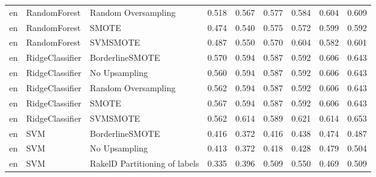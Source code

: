 \begin{tabular}{lllllllll}
      en &                    RandomForest &           Random Oversampling & 0.518 &                     0.567 &                 0.577 &                  0.584 &                                   0.604 &     0.609 \\
      en &                    RandomForest &                         SMOTE & 0.474 &                     0.540 &                 0.575 &                  0.572 &                                   0.599 &     0.592 \\
      en &                    RandomForest &                      SVMSMOTE & 0.487 &                     0.550 &                 0.570 &                  0.604 &                                   0.582 &     0.601 \\
      en &                 RidgeClassifier &               BorderlineSMOTE & 0.570 &                     0.594 &                 0.587 &                  0.592 &                                   0.606 &     0.643 \\
      en &                 RidgeClassifier &                 No Upsampling & 0.560 &                     0.594 &                 0.587 &                  0.592 &                                   0.606 &     0.643 \\
      en &                 RidgeClassifier &           Random Oversampling & 0.562 &                     0.594 &                 0.587 &                  0.592 &                                   0.606 &     0.643 \\
      en &                 RidgeClassifier &                         SMOTE & 0.567 &                     0.594 &                 0.587 &                  0.592 &                                   0.606 &     0.643 \\
      en &                 RidgeClassifier &                      SVMSMOTE & 0.562 &                     0.614 &                 0.589 &                  0.621 &                                   0.614 &     0.653 \\
      en &                             SVM &               BorderlineSMOTE & 0.416 &                     0.372 &                 0.416 &                  0.438 &                                   0.474 &     0.487 \\
      en &                             SVM &                 No Upsampling & 0.413 &                     0.372 &                 0.418 &                  0.428 &                                   0.479 &     0.504 \\
      en &                             SVM & RakelD Partitioning of labels & 0.335 &                     0.396 &                 0.509 &                  0.550 &                                   0.469 &     0.509 \\

\end{tabular}
